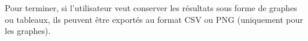 Pour terminer, si l'utilisateur veut conserver les résultats sous
forme de graphes ou tableaux, ils peuvent être exportés au format CSV
ou PNG (uniquement pour les graphes).



